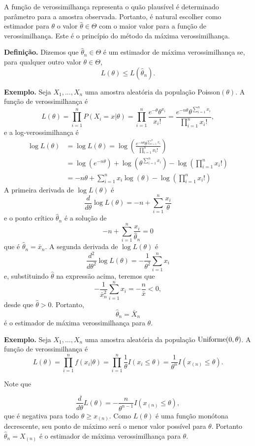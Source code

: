 \documentclass[
  letterpaper,
  DIV=11,
  numbers=noendperiod]{scrartcl}
\begin{document}
A função de verossimilhança representa o quão plausível é determinado
parâmetro para a amostra observada. Portanto, é natural escolher como
estimador para \(\theta\) o valor \(\hat{\theta}\in\Theta\) com o maior
valor para a função de verossimilhança. Este é o princípio do método da
máxima verossimilhança.

\textbf{Definição.} Dizemos que \(\hat{\theta}_n\in\Theta\) é um
estimador de máxima verossimilhança se, para qualquer outro valor
\(\theta\in\Theta\), \[L(\theta)\leq L(\hat{\theta}_n).\]

\textbf{Exemplo.} Seja \(X_1,\ldots,X_n\) uma amostra aleatória da
população Poisson\((\theta)\). A função de verossimilhança é
\[L(\theta)=\prod_{i=1}^{n}P(X_i=x|\theta)=\prod_{i=1}^{n}\frac{e^{-\theta}\theta^{x_i}}{x_i!}=\frac{e^{-n\theta}\theta^{\sum
_{i=1}^{n}x_i}}{\prod_{i=1}^{n}x_i!},\] e a log-verossimilhança é
\[\begin{align*}
\log L(\theta)&=\log L(\theta)=\log\left(\frac{e^{-n\theta}\theta^{\sum
_{i=1}^{n}x_i}}{\prod_{i=1}^{n}x_i!}\right)\\
&= \log\left(e^{-n\theta}\right) +\log\left(\theta^{\sum
_{i=1}^{n}x_i}\right) -\log\left(\prod_{i=1}^{n}x_i!\right)\\
&= -n\theta +\sum_{i=1}^{n}x_i\log(\theta) -\log\left(\prod_{i=1}^{n}x_i!\right)
\end{align*}\] A primeira derivada de \(\log L(\theta)\) é
\[\frac{d}{d\theta}\log L(\theta)=-n+\sum_{i=1}^{n}\frac{x_i}{\theta}\]
e o ponto crítico \(\hat{\theta}_n\) é a solução de
\[-n+\sum_{i=1}^n \frac{x_i}{\hat{\theta}_n}=0\] que é
\(\hat{\theta}_n=\bar{x}_n\). A segunda derivada de \(\log L(\theta)\) é
\[\frac{d^2}{d\theta^2}\log L(\theta)=-\frac{1}{\theta^2}\sum_{i=1}^{n}x_i\]
e, substituindo \(\hat{\theta}\) na expressão acima, teremos que
\[-\frac{1}{\bar{x}_n^2}\sum_{i=1}^n x_i=-\frac{n}{\bar{x}}<0,\] desde
que \(\hat{\theta}>0\). Portanto, \[\hat{\theta}_n=\bar{X}_n\] é o
estimador de máxima verossimilhança para \(\theta\).

\textbf{Exemplo.} Seja \(X_1,\ldots,X_n\) uma amostra aleatória da
população \(\hbox{Uniforme}(0,\theta)\). A função de verossimilhança é
\[L(\theta)=\prod_{i=1}^{n}f(x_i|\theta)=\prod_{i=1}^{n}\frac{1}{\theta}I(x_i\leq\theta)=\frac{1}{\theta^n}I(x_{(n)}\leq \theta).\]

Note que

\[\frac{d}{d\theta}L(\theta)=-\frac{n}{\theta^{n-1}}I(x_{(n)}\leq \theta),\]
que é negativa para todo \(\theta \geq x_{(n)}\). Como \(L(\theta)\) é
uma função monótona decrescente, seu ponto de máximo será o menor valor
possível para \(\theta\). Portanto \(\hat{\theta}_n=X_{(n)}\) é o
estimador de máxima verossimilhança para \(\theta\).
\end{document}
